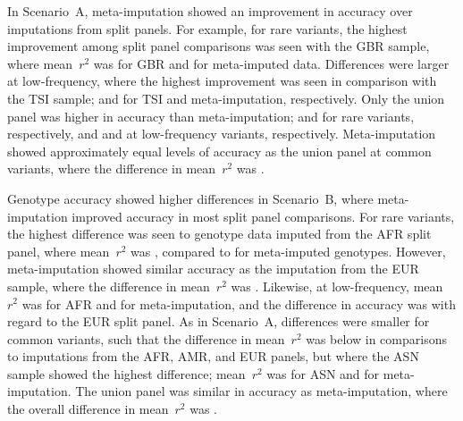 In Scenario~A, meta-imputation showed an improvement in accuracy over imputations from split panels.
For example, for rare variants, the highest improvement among split panel comparisons was seen with the GBR sample, where mean~$r^2$ was  for GBR and  for meta-imputed data.
Differences were larger at low-frequency, where the highest improvement was seen in comparison with the TSI sample;
 and 
for TSI and meta-imputation, respectively.
Only the union panel was higher in accuracy than meta-imputation; \eg
{} and 
for rare variants, respectively, and
 and 
at low-frequency variants, respectively.
Meta-imputation showed approximately equal levels of accuracy as the union panel at common variants, where the difference in mean~$r^2$ was .

%

%

Genotype accuracy showed higher differences in Scenario~B, where meta-imputation improved accuracy in most split panel comparisons.
For rare variants, the highest difference was seen to genotype data imputed from the AFR split panel, where mean~$r^2$ was , compared to  for meta-imputed genotypes.
However, meta-imputation showed similar accuracy as the imputation from the EUR sample, where the difference in mean~$r^2$ was .
Likewise, at low-frequency, mean~$r^2$ was  for AFR and  for meta-imputation, and the difference in accuracy was  with regard to the EUR split panel.
As in Scenario~A, differences were smaller for common variants, such that the difference in mean~$r^2$ was below  in comparisons to imputations from the AFR, AMR, and EUR panels, but where the ASN sample showed the highest difference; mean~$r^2$ was  for ASN and  for meta-imputation.
The union panel was similar in accuracy as meta-imputation, where the overall difference in mean~$r^2$ was .

